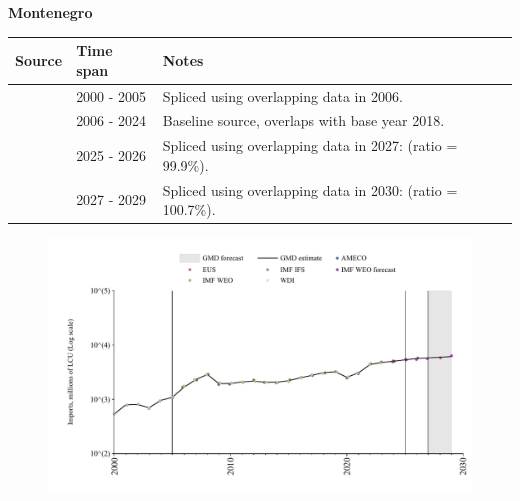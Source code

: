 \documentclass[12pt,a4paper,landscape]{article}
\begin{document}
\begin{adjustbox}{max totalsize={\paperwidth}{\paperheight},center}
\begin{minipage}[t][\textheight][t]{\textwidth}
\vspace*{0.5cm}
{}
\begin{center}
{\Large\bfseries Montenegro}
\end{center}
\vspace{0.5cm}
\begin{table}[H]
\centering
\small
\begin{tabular}{|l|l|l|}
\hline
\textbf{Source} & \textbf{Time span} & \textbf{Notes} \\
\hline
\rowcolor{white}\cite{AMECO}& 2000 - 2005 &Spliced using overlapping data in 2006.\\
\rowcolor{lightgray}\cite{EUS}& 2006 - 2024 &Baseline source, overlaps with base year 2018.\\
\rowcolor{white}\cite{AMECO}& 2025 - 2026 &Spliced using overlapping data in 2027: (ratio = 99.9\%).\\
\rowcolor{lightgray}\cite{IMF_WEO_forecast}& 2027 - 2029 &Spliced using overlapping data in 2030: (ratio = 100.7\%).\\
\hline
\end{tabular}
\end{table}
\begin{figure}[H]
\centering
\includegraphics[width=\textwidth,height=0.6\textheight,keepaspectratio]{graphs/MNE_imports.pdf}
\end{figure}
\end{minipage}
\end{adjustbox}
\end{document}
